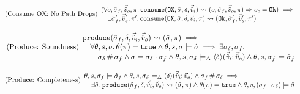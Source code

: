 \begin{equation}
\tag{Consume OX: No Path Drops}\label{eq:consume-ox-no-drop}
\begin{array}{l}
(\forall o, \hat{\sigma}_f,\vec{\hat{v}}_o,\pi \ldotp \texttt{consume}(\texttt{OX},\hat{\sigma},\delta,\vec{\hat{v}}_i)\rightsquigarrow (o, \hat{\sigma}_f, \vec{\hat{v}}_o, \pi)\Rightarrow o_c = \texttt{Ok}) \implies \\
\quad \exists  \hat{\sigma}_f',\vec{\hat{v}}_o',\pi' \ldotp \texttt{consume}(\texttt{OX}, \hat{\sigma}, \delta,\vec{v}_i,\pi)\rightsquigarrow (\texttt{Ok}, \hat{\sigma}_f', \vec{\hat{v}}_o', \pi')
\end{array}
\end{equation}

\begin{equation}
\tag{Produce: Soundness}\label{eq:produce-sound}
\begin{array}{l}
\texttt{produce}(\hat{\sigma}_f,\delta,\vec{\hat{v}}_i,\vec{\hat{v}}_o)\rightsquigarrow (\hat{\sigma}, \pi) \implies\\
\quad \forall\theta,s,\sigma\ldotp \theta(\pi)=\texttt{true} \land \theta,s,\sigma\models\hat{\sigma} \implies \exists \sigma_\delta, \sigma_f\ldotp \\
\qquad \sigma_\delta\operatorname{\#}\sigma_f \land \sigma=\sigma_\delta\cdot\sigma_f \land \theta,s,\sigma_\delta \models_{\Delta} \left<\delta\right>\!(\vec{\hat{v}}_i;\vec{\hat{v}}_o) \land \theta,s,\sigma_f \models \hat{\sigma}_f
\end{array}
\end{equation}

\begin{equation}
\tag{Produce: Completeness}\label{eq:produce-complete}
\begin{array}{l}
\theta, s, \sigma_f \models \hat{\sigma}_f \land \theta, s, \sigma_\delta \models_{\Delta} \left<\delta\right>\!(\vec{\hat{v}}_i;\vec{v}_o) \land \sigma_f\operatorname{\#}\sigma_\delta \implies \\
\quad \exists \hat{\sigma}\ldotp \texttt{produce}(\hat{\sigma}_f,\delta,\vec{\hat{v}}_i,\vec{\hat{v}}_o)\rightsquigarrow (\hat{\sigma},\pi) \land \theta(\pi)=\texttt{true} \land \theta,s,(\sigma_f\cdot\sigma_\delta) \models \hat{\sigma}
\end{array}
\end{equation}

